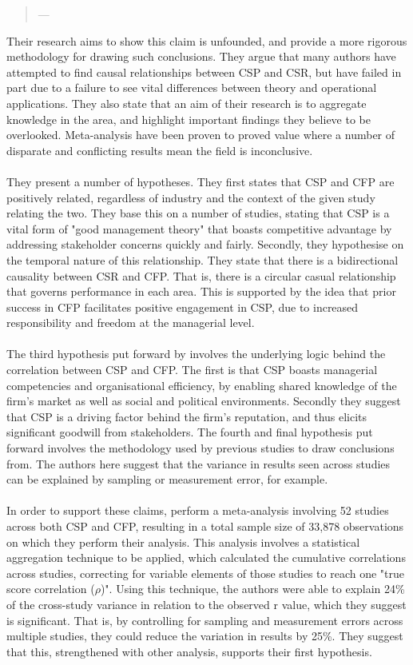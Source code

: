 {\begin{quote}
\hspace{2cm}--- \cite{orlitzky2003corporate}
\end{quote}
Their research aims to show this claim is unfounded, and provide a more rigorous methodology for drawing such conclusions. They argue that many authors have attempted to find causal relationships between CSP and CSR, but have failed in part due to a failure to see vital differences between theory and operational applications. They also state that an aim of their research is to aggregate knowledge in the area, and highlight important findings they believe to be overlooked. Meta-analysis have been proven to proved value where a number of disparate and conflicting results mean the field is inconclusive.\\\\
They present a number of hypotheses. They first states that CSP and CFP are positively related, regardless of industry and the context of the given study relating the two. They base this on a number of studies, stating that CSP is a vital form of "good management theory" that boasts competitive advantage by addressing stakeholder concerns quickly and fairly.  Secondly, they hypothesise on the temporal nature of this relationship. They state that there is a bidirectional causality between CSR and CFP. That is, there is a circular casual relationship that governs performance in each area. This is supported by the idea that prior success in CFP facilitates positive engagement in CSP, due to increased responsibility and freedom at the managerial level. \\\\
The third hypothesis put forward by \cite{orlitzky2003corporate} involves the underlying logic behind the correlation between CSP and CFP. The first is that CSP boasts managerial competencies and organisational efficiency, by enabling shared knowledge of the firm's market as well as social and political environments. Secondly they suggest that CSP is a driving factor behind the firm's reputation, and thus elicits significant goodwill from stakeholders. The fourth and final hypothesis put forward involves the methodology used by previous studies to draw conclusions from. The authors here suggest that the variance in results seen across studies can be explained by sampling or measurement error, for example. 
\\\\
In order to support these claims, \cite{orlitzky2003corporate} perform a meta-analysis involving 52 studies across both CSP and CFP, resulting in a total sample size of 33,878 observations on which they perform their analysis. This analysis involves a statistical aggregation technique to be applied, which calculated the cumulative correlations across studies, correcting for variable elements of those studies to reach one "true score correlation ($\rho$)". Using this technique, the authors were able to explain 24\% of the cross-study variance in relation to the observed r value, which they suggest is significant. That is, by controlling for sampling and measurement errors across multiple studies, they could reduce the variation in results by 25\%. They suggest that this, strengthened with other analysis, supports their first hypothesis. }
